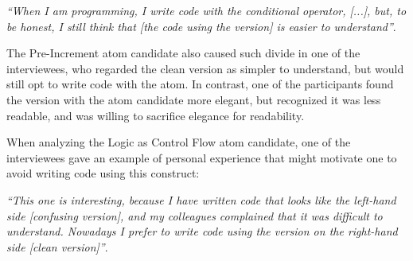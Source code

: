\begin{mq}
\emph{``When I am programming, I write code with the conditional operator, [...], but, to be honest, I still think that 
[the code using the \rhs version] 
is easier to understand''}.
\end{mq}



The Pre-Increment atom candidate also caused such
divide in one of the interviewees, who
regarded the clean version as simpler to understand, but would still opt to write
code with the atom. In contrast, %
one of the participants found the version with the atom candidate more elegant, but recognized it was less readable, and was willing to sacrifice elegance for readability.


When analyzing the Logic as Control Flow atom candidate, one of the interviewees gave an example of personal experience that might motivate one to avoid writing code using this construct:

\begin{mq}
  \emph{``This one is interesting, because I have written code that looks like the left-hand side [confusing version], and my colleagues complained that it was difficult to understand. Nowadays I prefer to write code using the version on the right-hand side [clean version]''}.
\end{mq}

